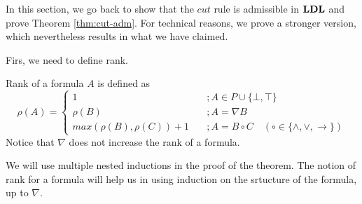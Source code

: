 In this section, we go back to show that the $cut$ rule is admissible in $\mathbf{LDL}$ and prove Theorem \ref{thm:cut-adm}. For technical reasons, we prove a stronger version, which nevertheless results in what we have claimed.

Firs, we need to define rank.

\begin{dfn}
  Rank of a formula $A$ is defined as
  \[ \rho(A) = \begin{cases}
  1 & \quad ; A \in P \cup \{ \bot, \top \} \\
  \rho(B) & \quad ; A = \nabla B \\
  max(\rho(B), \rho(C)) + 1 & \quad ; A = B \circ C \quad (\circ \in \{ \land, \lor, \rightarrow \})
  \end{cases} \]
  Notice that $\nabla$ does not increase the rank of a formula.
\end{dfn}

We will use multiple nested inductions in the proof of the theorem. The notion of rank for a formula will help us in using induction on the srtucture of the formula, up to $\nabla$.

